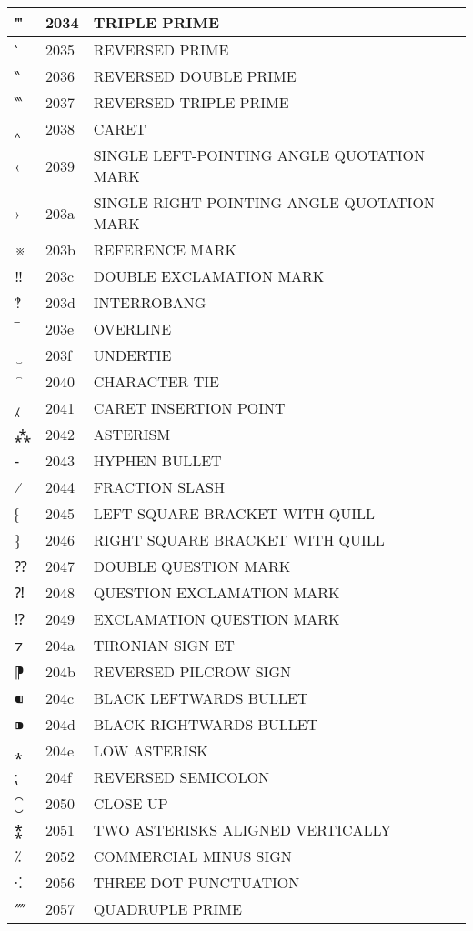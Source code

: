 \documentclass[12pt,letterpaper,openany]{book}
\begin{document}
\begin{center}
\begin{supertabular}{|m{0.25in}|m{0.5in}|m{4in}|}
‴ & 2034 & TRIPLE PRIME\\\hline
‵ & 2035 & REVERSED PRIME\\\hline
‶ & 2036 & REVERSED DOUBLE PRIME\\\hline
‷ & 2037 & REVERSED TRIPLE PRIME\\\hline
‸ & 2038 & CARET\\\hline
‹ & 2039 & SINGLE LEFT-POINTING ANGLE QUOTATION MARK\\\hline
› & 203a & SINGLE RIGHT-POINTING ANGLE QUOTATION MARK\\\hline
※ & 203b & REFERENCE MARK\\\hline
‼ & 203c & DOUBLE EXCLAMATION MARK\\\hline
‽ & 203d & INTERROBANG\\\hline
‾ & 203e & OVERLINE\\\hline
‿ & 203f & UNDERTIE\\\hline
⁀ & 2040 & CHARACTER TIE\\\hline
⁁ & 2041 & CARET INSERTION POINT\\\hline
⁂ & 2042 & ASTERISM\\\hline
⁃ & 2043 & HYPHEN BULLET\\\hline
⁄ & 2044 & FRACTION SLASH\\\hline
⁅ & 2045 & LEFT SQUARE BRACKET WITH QUILL\\\hline
⁆ & 2046 & RIGHT SQUARE BRACKET WITH QUILL\\\hline
⁇ & 2047 & DOUBLE QUESTION MARK\\\hline
⁈ & 2048 & QUESTION EXCLAMATION MARK\\\hline
⁉ & 2049 & EXCLAMATION QUESTION MARK\\\hline
⁊ & 204a & TIRONIAN SIGN ET\\\hline
⁋ & 204b & REVERSED PILCROW SIGN\\\hline
⁌ & 204c & BLACK LEFTWARDS BULLET\\\hline
⁍ & 204d & BLACK RIGHTWARDS BULLET\\\hline
⁎ & 204e & LOW ASTERISK\\\hline
⁏ & 204f & REVERSED SEMICOLON\\\hline
⁐ & 2050 & CLOSE UP\\\hline
⁑ & 2051 & TWO ASTERISKS ALIGNED VERTICALLY\\\hline
⁒ & 2052 & COMMERCIAL MINUS SIGN\\\hline
⁖ & 2056 & THREE DOT PUNCTUATION\\\hline
⁗ & 2057 & QUADRUPLE PRIME\\\hline

\end{supertabular}
\end{center}
\end{document}
